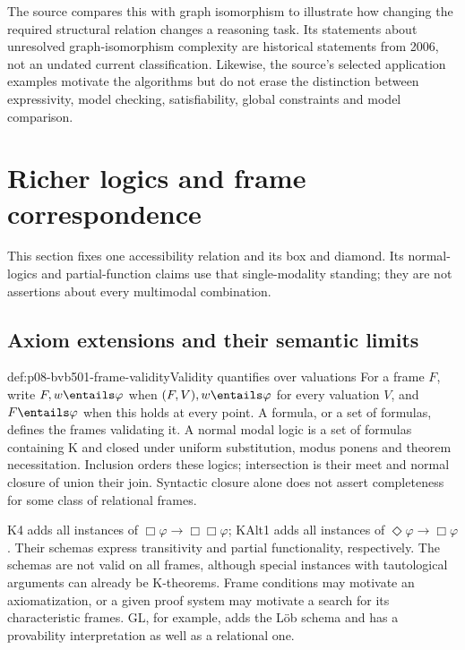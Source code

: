 The source compares this with graph isomorphism to illustrate how changing
the required structural relation changes a reasoning task. Its statements
about unresolved graph-isomorphism complexity are historical statements
from 2006, not an undated current classification. Likewise, the source's
selected application examples motivate the algorithms but do not erase
the distinction between expressivity, model checking, satisfiability,
global constraints and model comparison.

\section{Richer logics and frame correspondence}
\label{sec:p08-bvb501-frame-logics}

This section fixes one accessibility relation and its box and diamond.
Its normal-logics and partial-function claims use that single-modality
standing; they are not assertions about every multimodal combination.

\subsection{Axiom extensions and their semantic limits}
\label{sec:p08-bvb501-axioms}

\begin{hbdefinition}{def:p08-bvb501-frame-validity}{Validity quantifies over valuations}
For a frame \(F\), write \(F,w\entails\varphi\) when
\((F,V),w\entails\varphi\) for every valuation \(V\), and
\(F\entails\varphi\) when this holds at every point. A formula,
or a set of formulas, defines the frames validating it. A normal modal
logic is a set of formulas containing K and closed under uniform
substitution, modus ponens and theorem necessitation. Inclusion orders
these logics; intersection is their meet and normal closure of union
their join. Syntactic closure alone does not assert completeness for
some class of relational frames.
\end{hbdefinition}

K4 adds all instances of \(\Box\varphi\to\Box\Box\varphi\);
KAlt1 adds all instances of \(\Diamond\varphi\to\Box\varphi\).
Their schemas express transitivity and partial functionality, respectively.
The schemas are not valid on all frames, although special instances with
tautological arguments can already be K-theorems. Frame conditions may
motivate an axiomatization, or a given proof system may motivate a search
for its characteristic frames. GL, for example, adds the L\"ob schema
and has a provability interpretation as well as a relational one.


